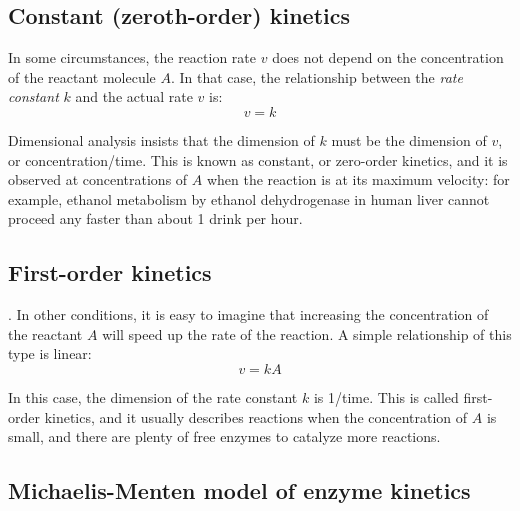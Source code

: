 \documentclass[
]{book}
\begin{document}
\hypertarget{constant-zeroth-order-kinetics}{%
\subsection{Constant (zeroth-order) kinetics}\label{constant-zeroth-order-kinetics}}

 In some circumstances, the reaction rate \(v\) does not depend on the concentration of the reactant molecule \(A\). In that case, the relationship between the  \emph{rate constant} \(k\) and the actual rate \(v\) is:
\begin{equation}
v = k
\label{eq:kinetics_0th_order}
\end{equation}

Dimensional analysis insists that the dimension of \(k\) must be the dimension of \(v\), or concentration/time. This is known as constant, or zero-order kinetics, and it is observed at concentrations of \(A\) when the reaction is at its maximum velocity: for example, ethanol metabolism by ethanol dehydrogenase in human liver cannot proceed any faster than about 1 drink per hour.

\hypertarget{first-order-kinetics}{%
\subsection{First-order kinetics}\label{first-order-kinetics}}

. In other conditions, it is easy to imagine that increasing the concentration of the reactant \(A\) will speed up the rate of the reaction. A simple relationship of this type is linear:
\begin{equation}
v = kA
\label{eq:kinetics_1st_order}
\end{equation}

In this case, the dimension of the rate constant \(k\) is 1/time. This is called first-order kinetics, and it usually describes reactions when the concentration of \(A\) is small, and there are plenty of free enzymes to catalyze more reactions.

\hypertarget{michaelis-menten-model-of-enzyme-kinetics}{%
\subsection{\texorpdfstring{Michaelis-Menten model of enzyme kinetics }{Michaelis-Menten model of enzyme kinetics }}\label{michaelis-menten-model-of-enzyme-kinetics}}
\end{document}
